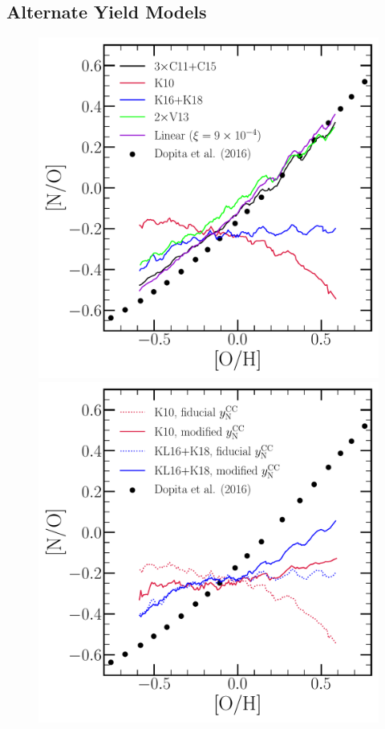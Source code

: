 \documentclass[ms.tex]{subfiles}
\begin{document}
\subsection{Alternate Yield Models} 
\label{sec:results:yields} 

\begin{figure} 
\centering 
\includegraphics[scale = 0.45]{no_oh_predictions.pdf} 
\includegraphics[scale = 0.45]{no_oh_predictions_karakas.pdf} 

\end{figure}
\end{document}
